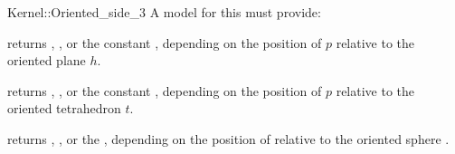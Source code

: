 \begin{ccRefFunctionObjectConcept}{Kernel::Oriented_side_3}
A model for this must provide:


{returns ,
, or the constant ,
depending on the position of $p$  relative to the oriented plane $h$.}

{returns ,
, or the constant ,
depending on the position of $p$  relative to the oriented tetrahedron $t$.}

{returns ,
, or the ,
depending on the position of   relative to the oriented sphere .}

\ccIsModel{}

\end{ccRefFunctionObjectConcept}
